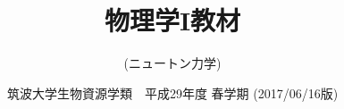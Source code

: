 \documentclass[twocolumn,9.5pt,fleqn,dvipdfmx]{jsbook}
\begin{document}
\title {{\Huge 物理学I教材}\\ }
\author{{\Large (ニュートン力学)}\\ }
\date{{\Large 筑波大学生物資源学類　平成29年度 春学期 (2017/06/16版)}}
\maketitle
\newpage
\frontmatter
%
\tableofcontents
\mainmatter














\printindex
\end{document}
